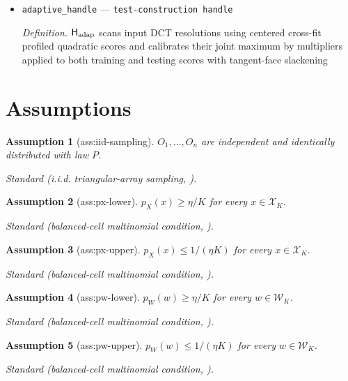 \documentclass{article}
\newtheorem{assumption}{Assumption}
\begin{document}
\begin{itemize}
  \item \texttt{adaptive\_\allowbreak{}handle} --- \texttt{test-\allowbreak{}construction handle}
  \par\smallskip\noindent\emph{Definition.} \(\mathsf H_{\rm adap}\) scans input DCT resolutions using centered cross-fit profiled quadratic scores and calibrates their joint maximum by multipliers applied to both training and testing scores with tangent-face slackening
\end{itemize}

\section{Assumptions}

\begin{assumption}[ass:iid-sampling]\label{ass:iid-sampling}
\(O_1,\ldots,O_n\) are independent and identically distributed with law \(P\).
\par\smallskip\noindent\emph{Standard} (i.i.d. triangular-array sampling, \cite{vanDerVaart1998}).
\end{assumption}

\begin{assumption}[ass:px-lower]\label{ass:px-lower}
\(p_X(x)\ge \eta/K\) for every \(x\in\mathcal X_K\).
\par\smallskip\noindent\emph{Standard} (balanced-cell multinomial condition, \cite{Carter2002}).
\end{assumption}

\begin{assumption}[ass:px-upper]\label{ass:px-upper}
\(p_X(x)\le 1/(\eta K)\) for every \(x\in\mathcal X_K\).
\par\smallskip\noindent\emph{Standard} (balanced-cell multinomial condition, \cite{Carter2002}).
\end{assumption}

\begin{assumption}[ass:pw-lower]\label{ass:pw-lower}
\(p_W(w)\ge \eta/K\) for every \(w\in\mathcal W_K\).
\par\smallskip\noindent\emph{Standard} (balanced-cell multinomial condition, \cite{Carter2002}).
\end{assumption}

\begin{assumption}[ass:pw-upper]\label{ass:pw-upper}
\(p_W(w)\le 1/(\eta K)\) for every \(w\in\mathcal W_K\).
\par\smallskip\noindent\emph{Standard} (balanced-cell multinomial condition, \cite{Carter2002}).
\end{assumption}
\end{document}
